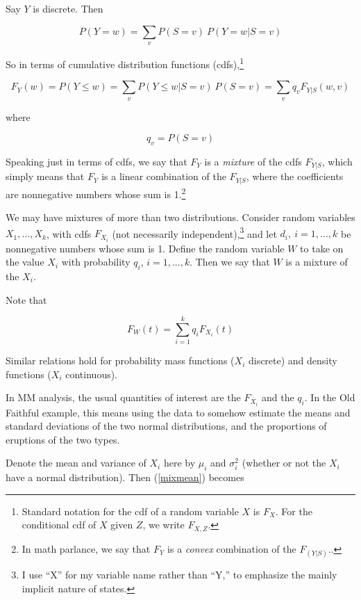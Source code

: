 \documentclass[11pt]{article}
\begin{document}
Say $Y$ is discrete.  Then

\begin{equation}
P(Y = w) = \sum_{v} P(S = v) ~ P(Y = w | S = v)
\end{equation}

So in terms of cumulative distribution functions
(cdfs),\footnote{Standard notation for the cdf of a random variable $X$
is $F_X$.  For the conditional cdf of $X$ given $Z$, we write
$F_{X,Z}$.}

\begin{equation}
\label{mixedFs}
F_Y(w) = P(Y \leq w) = 
\sum_{v} P(Y \leq w | S = v) ~ P(S = v) =
\sum_{v} q_v F_{Y|S}(w,v)
\end{equation}

where 

\begin{equation}
q_v = P(S = v)
\end{equation}

Speaking just in terms of cdfs, we say that $F_Y$ is a \textit{mixture}
of the cdfs $F_{Y|S}$, which simply means that $F_Y$ is a linear
combination of the $F_{Y|S}$, where the coefficients are nonnegative
numbers whose sum is 1.\footnote{In math parlance, we say that $F_Y$ is
a \textit{convex} combination of the $F_{(Y|S)}$..}

We may have mixtures of more than two distributions.  Consider random
variables $X_1,...,X_k$, with cdfs $F_{X_i}$ (not necessarily
independent),\footnote{I use ``X'' for my variable name rather than
``Y,'' to emphasize the mainly implicit nature of states.} and let $d_i,
~ i=1,...,k$ be nonnegative numbers whose sum is 1.  Define the random
variable $W$ to take on the value $X_i$ with probability $q_i$,
$i=1,...,k$.  Then we say that $W$ is a mixture of the $X_i$.

Note that

\begin{equation}
F_{W}(t) = \sum_{i=1}^k q_i F_{X_i}(t)
\end{equation}

Similar relations hold for probability mass functions ($X_i$ discrete)
and density functions ($X_i$ continuous).

In MM analysis, the usual quantities of interest are the 
$F_{X_i}$ and the $q_i$.  In the Old Faithful example, this
means using the data to somehow estimate the means and
standard deviations of the two normal distributions, and the proportions
of eruptions of the two types.

Denote the mean and variance of $X_i$ here by $\mu_i$ and $\sigma_i^2$
(whether or not the $X_i$ have a normal distribution).  Then
(\ref{mixmean}) becomes
\end{document}
